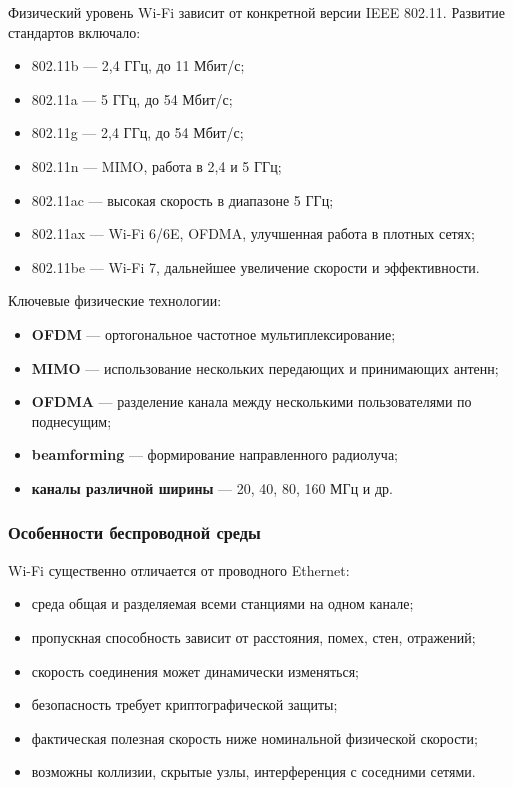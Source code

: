 \documentclass[12pt,a4paper]{article}
\begin{document}
Физический уровень Wi-Fi зависит от конкретной версии IEEE 802.11. Развитие стандартов включало:
\begin{itemize}
    \item 802.11b --- 2{,}4 ГГц, до 11 Мбит/с;
    \item 802.11a --- 5 ГГц, до 54 Мбит/с;
    \item 802.11g --- 2{,}4 ГГц, до 54 Мбит/с;
    \item 802.11n --- MIMO, работа в 2{,}4 и 5 ГГц;
    \item 802.11ac --- высокая скорость в диапазоне 5 ГГц;
    \item 802.11ax --- Wi-Fi 6/6E, OFDMA, улучшенная работа в плотных сетях;
    \item 802.11be --- Wi-Fi 7, дальнейшее увеличение скорости и эффективности.
\end{itemize}

Ключевые физические технологии:
\begin{itemize}
    \item \textbf{OFDM} --- ортогональное частотное мультиплексирование;
    \item \textbf{MIMO} --- использование нескольких передающих и принимающих антенн;
    \item \textbf{OFDMA} --- разделение канала между несколькими пользователями по поднесущим;
    \item \textbf{beamforming} --- формирование направленного радиолуча;
    \item \textbf{каналы различной ширины} --- 20, 40, 80, 160 МГц и др.
\end{itemize}

\subsubsection{Особенности беспроводной среды}

Wi-Fi существенно отличается от проводного Ethernet:
\begin{itemize}
    \item среда общая и разделяемая всеми станциями на одном канале;
    \item пропускная способность зависит от расстояния, помех, стен, отражений;
    \item скорость соединения может динамически изменяться;
    \item безопасность требует криптографической защиты;
    \item фактическая полезная скорость ниже номинальной физической скорости;
    \item возможны коллизии, скрытые узлы, интерференция с соседними сетями.
\end{itemize}
\end{document}
